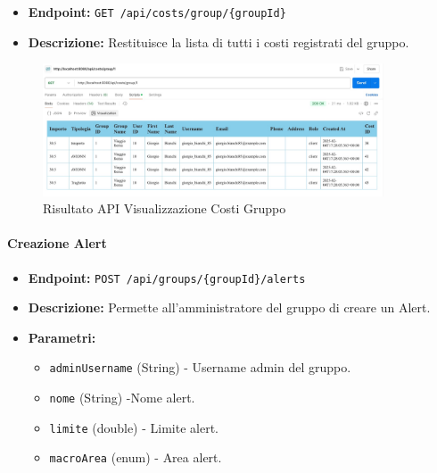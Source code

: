 \begin{itemize}
    \item \textbf{Endpoint:} \texttt{GET /api/costs/group/\{groupId\}}
    \item \textbf{Descrizione:} Restituisce la lista di tutti i costi registrati del gruppo.
\end{itemize}

\begin{figure}[H]
    \centering
    \includegraphics[width=0.9\textwidth]{images/getGroupCosts.jpeg}
    \caption{Risultato API Visualizzazione Costi Gruppo}
    \label{fig:api_view_group_costs}
\end{figure}


\paragraph{Creazione Alert} 

\begin{itemize}
    \item \textbf{Endpoint:} \texttt{POST /api/groups/\{groupId\}/alerts}
    \item \textbf{Descrizione:} Permette all'amministratore del gruppo di creare un Alert.
    \item \textbf{Parametri:}
    \begin{itemize}
        \item \texttt{adminUsername} (String) - Username admin del gruppo.
        \item \texttt{nome} (String) -Nome alert.
        \item \texttt{limite} (double) - Limite alert.
        \item \texttt{macroArea} (enum) - Area alert.
    \end{itemize}
\end{itemize}


